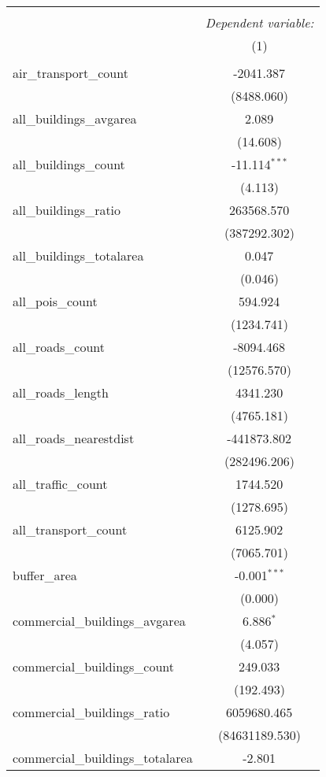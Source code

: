 \begin{table}[!htbp] \centering
\begin{tabular}{@{\extracolsep{5pt}}lc}
\\[-1.8ex]\hline
\hline \\[-1.8ex]
& \multicolumn{1}{c}{\textit{Dependent variable:}} \
\cr \cline{1-2}
\\[-1.8ex] & (1) \\
\hline \\[-1.8ex]
 air_transport_count & -2041.387$^{}$ \\
  & (8488.060) \\
 all_buildings_avgarea & 2.089$^{}$ \\
  & (14.608) \\
 all_buildings_count & -11.114$^{***}$ \\
  & (4.113) \\
 all_buildings_ratio & 263568.570$^{}$ \\
  & (387292.302) \\
 all_buildings_totalarea & 0.047$^{}$ \\
  & (0.046) \\
 all_pois_count & 594.924$^{}$ \\
  & (1234.741) \\
 all_roads_count & -8094.468$^{}$ \\
  & (12576.570) \\
 all_roads_length & 4341.230$^{}$ \\
  & (4765.181) \\
 all_roads_nearestdist & -441873.802$^{}$ \\
  & (282496.206) \\
 all_traffic_count & 1744.520$^{}$ \\
  & (1278.695) \\
 all_transport_count & 6125.902$^{}$ \\
  & (7065.701) \\
 buffer_area & -0.001$^{***}$ \\
  & (0.000) \\
 commercial_buildings_avgarea & 6.886$^{*}$ \\
  & (4.057) \\
 commercial_buildings_count & 249.033$^{}$ \\
  & (192.493) \\
 commercial_buildings_ratio & 6059680.465$^{}$ \\
  & (84631189.530) \\
 commercial_buildings_totalarea & -2.801$^{}$ \\

\end{tabular}
\end{table}
